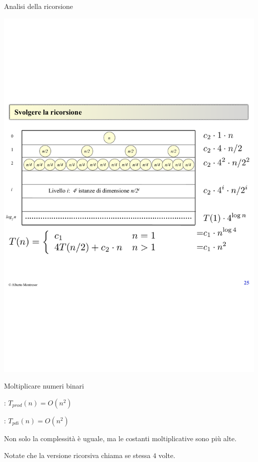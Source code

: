 \begin{frame}{Analisi della ricorsione}

\includegraphics[width=\textwidth]{ricorsione.pdf}

\end{frame}

\begin{frame}{Moltiplicare numeri binari}

\vspace{-9pt}
\begin{myboxtitle}
\BI
\item {}: $T_{prod}(n) = O(n^2)$
\item {}: $T_{pdi}(n) = O(n^2)$
\EI
\end{myboxtitle}

\smallskip
\begin{myboxtitle}
Non solo la complessità è uguale, ma le costanti moltiplicative 
sono più alte.	
\end{myboxtitle}

\smallskip
\begin{myboxtitle}
Notate che la versione ricorsiva chiama se stessa $4$ volte.
\end{myboxtitle} 

\end{frame}

